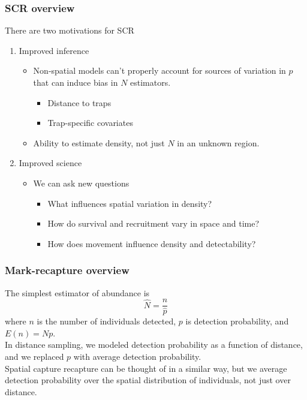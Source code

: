 \documentclass[color=usenames,dvipsnames]{beamer}\usepackage[]{graphicx}\usepackage[]{color}
\begin{document}
\begin{frame}
  \frametitle{SCR overview}
  {\centering There are two motivations for SCR \\}
  \vfill
  \begin{enumerate}
    \item Improved inference
    \begin{itemize}
      \item<1-> Non-spatial models can't properly account for sources
        of variation in $p$ that can induce bias in $N$ estimators.
        \begin{itemize}
          \item<1-> Distance to traps
          \item<1-> Trap-specific covariates
        \end{itemize}
      \item<2-> Ability to estimate \alert{density}, not just $N$ in an
        unknown region. 
    \end{itemize}
    \pause
    \vfill
  \item<3-> Improved science
  \begin{itemize}
    \item<3-> We can ask new questions
      \begin{itemize}
        \item<3-> What influences spatial variation in density?
        \item<4-> How do survival and recruitment vary in space and time?
        \item<5-> How does movement influence density and detectability?
      \end{itemize}
    \end{itemize}
  \end{enumerate}
\end{frame}



\begin{frame}
  \frametitle{Mark-recapture overview}
  The simplest estimator of abundance is 
  \[
    \hat{N} = \frac{n}{\hat{p}}
  \]
  where $n$ is the number of individuals detected, $p$ is detection
  probability, and $E(n)=Np$. \\
  \pause
  \vfill
  In distance sampling, we modeled detection probability as a
  function of distance, and we replaced $p$ with average detection
  probability. \\ 
  \pause
  \vfill
  Spatial capture recapture can be thought of in a similar way, but we 
  average detection probability over the spatial distribution of
  individuals, not just over distance. 
\end{frame}
\end{document}
